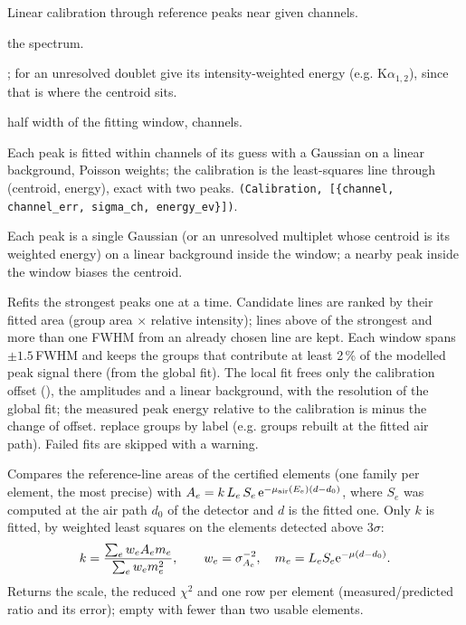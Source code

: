 Linear calibration through reference peaks near given channels.
\begin{args}
\item[y] the spectrum.
\item[peaks] ; for an unresolved doublet give its
  intensity-weighted energy (e.g. K$\alpha_{1,2}$), since that is where the centroid sits.
\item[half\_width] half width of the fitting window, channels.
\end{args}
 Each peak is fitted within  channels of its guess with a Gaussian
on a linear background, Poisson weights; the calibration is the least-squares line through
(centroid, energy), exact with two peaks.
 \texttt{(Calibration, [\{channel, channel\_err, sigma\_ch, energy\_ev\}])}.
\begin{hyp}
Each peak is a single Gaussian (or an unresolved multiplet whose centroid is its weighted
energy) on a linear background inside the window; a nearby peak inside the window biases the
centroid.
\end{hyp}

Refits the strongest peaks one at a time. Candidate lines are ranked by their fitted area
(group area $\times$ relative intensity); lines above  of the strongest and
more than one FWHM from an already chosen line are kept. Each window spans $\pm1.5$\,FWHM and
keeps the groups that contribute at least 2\,\% of the modelled peak signal there (from the
global fit). The local fit frees only the calibration offset (),
the amplitudes and a linear background, with the resolution of the global fit; the measured
peak energy relative to the calibration is minus the change of offset. 
replace groups by label (e.g. groups rebuilt at the fitted air path). Failed fits are skipped
with a warning.

Compares the reference-line areas of the certified elements (one family per element, the most
precise) with $A_e = k\,L_e\,S_e\,\mathrm{e}^{-\mu_\mathrm{air}(E_e)(d-d_0)}$, where $S_e$ was computed at
the air path $d_0$ of the detector and $d$ is the fitted one. Only $k$ is fitted, by weighted
least squares on the elements detected above $3\sigma$:
\begin{equation}
  k = \frac{\sum_e w_e A_e m_e}{\sum_e w_e m_e^2}, \qquad w_e = \sigma_{A_e}^{-2},
  \quad m_e = L_eS_e\mathrm{e}^{-\mu(d-d_0)} .
\end{equation}
Returns the scale, the reduced $\chi^2$ and one row per element (measured/predicted ratio and
its error); empty with fewer than two usable elements.

